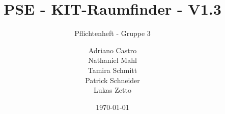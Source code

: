 \title{
    PSE - KIT-Raumfinder - V1.3
}
\subtitle{Pflichtenheft - Gruppe 3}
\author{
    Adriano Castro \\
    Nathaniel Mahl \\
    Tamira Schmitt \\
    Patrick Schneider \\
    Lukas Zetto
}

\date{\today}

\maketitle